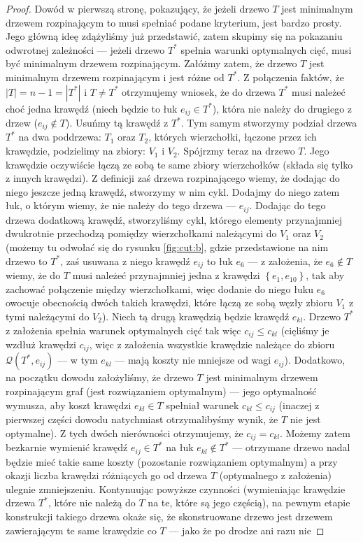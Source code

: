 \begin{proof}
	Dowód w pierwszą stronę, pokazujący, że jeżeli drzewo $T$ jest minimalnym drzewem rozpinającym to musi spełniać podane kryterium, jest bardzo prosty. Jego główną ideę zdążyliśmy już przedstawić, zatem skupimy się na pokazaniu odwrotnej zależności --- jeżeli drzewo $T^{\ast}$ spełnia warunki optymalnych cięć, musi być minimalnym drzewem rozpinającym. Załóżmy zatem, że drzewo $T$ jest minimalnym drzewem rozpinającym i jest różne od $T^{\ast}$. Z połączenia faktów, że $\left| T \right| = n - 1 = \left| T^{\ast} \right|$ i $T \neq T^{\ast}$ otrzymujemy wniosek, że do drzewa $T^{\ast}$ musi należeć choć jedna krawędź (niech będzie to łuk $e_{ij} \in T^{\ast}$), która nie należy do drugiego z drzew ($e_{ij} \notin T$). Usuńmy tą krawędź z $T^{\ast}$. Tym samym stworzymy podział drzewa $T^{\ast}$ na dwa poddrzewa: $T_{1}$ oraz $T_{2}$, których wierzchołki, łączone przez ich krawędzie, podzielimy na zbiory: $V_{1}$ i $V_{2}$. Spójrzmy teraz na drzewo $T$. Jego krawędzie oczywiście łączą ze sobą te same zbiory wierzchołków (składa się tylko z innych krawędzi). Z definicji zaś drzewa rozpinającego wiemy, że dodając do niego jeszcze jedną krawędź, stworzymy w nim cykl. Dodajmy do niego zatem łuk, o którym wiemy, że nie należy do tego drzewa --- $e_{ij}$. Dodając do tego drzewa dodatkową krawędź, stworzyliśmy cykl, którego elementy przynajmniej dwukrotnie przechodzą pomiędzy wierzchołkami należącymi do $V_{1}$ oraz $V_{2}$ (możemy tu odwołać się do rysunku \ref{fig:cut:b}, gdzie przedstawione na nim drzewo to $T^{\ast}$, zaś usuwana z niego krawędź $e_{ij}$ to łuk $e_{6}$ --- z założenia, że $e_{6} \notin T$ wiemy, że do $T$ musi należeć przynajmniej jedna z krawędzi $\left\{ e_{1}, e_{10} \right\}$, tak aby zachować połączenie między wierzchołkami, więc dodanie do niego łuku $e_{6}$ owocuje obecnością dwóch takich krawędzi, które łączą ze sobą węzły zbioru $V_{1}$ z tymi należącymi do $V_{2}$). Niech tą drugą krawędzią będzie krawędź $e_{kl}$. Drzewo $T^{\ast}$ z założenia spełnia warunek optymalnych cięć tak więc $c_{ij} \leqslant c_{kl}$ (cięliśmy je wzdłuż krawędzi $c_{ij}$, więc z założenia wszystkie krawędzie należące do zbioru $\mathcal{Q} \left( T^{\ast}, e_{ij} \right)$ --- w tym $e_{kl}$ --- mają koszty nie mniejsze od wagi $e_{ij}$). Dodatkowo, na początku dowodu założyliśmy, że drzewo $T$ jest minimalnym drzewem rozpinającym graf (jest rozwiązaniem optymalnym) --- jego optymalność wymusza, aby koszt krawędzi $e_{kl} \in T$ spełniał warunek $c_{kl} \leqslant c_{ij}$ (inaczej z pierwszej części dowodu natychmiast otrzymalibyśmy wynik, że $T$ nie jest optymalne). Z tych dwóch nierówności otrzymujemy, że $c_{ij} = c_{kl}$. Możemy zatem bezkarnie wymienić krawędź $e_{ij} \in T^{\ast}$ na łuk $e_{kl} \notin T^{\ast}$ --- otrzymane drzewo nadal będzie mieć takie same koszty (pozostanie rozwiązaniem optymalnym) a przy okazji liczba krawędzi różniących go od drzewa $T$ (optymalnego z założenia) ulegnie zmniejszeniu. Kontynuując powyższe czynności (wymieniając krawędzie drzewa $T^{\ast}$, które nie należą do $T$ na te, które są jego częścią), na pewnym etapie konstrukcji takiego drzewa okaże się, że skonstruowane drzewo jest drzewem zawierającym te same krawędzie co $T$ --- jako że po drodze ani razu nie 
\end{proof}
